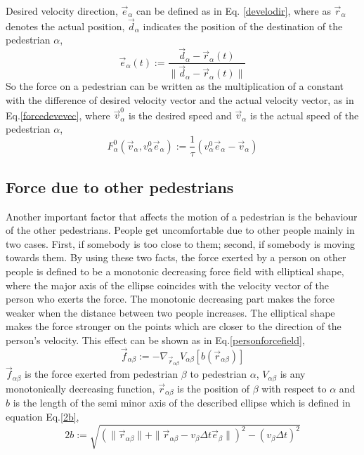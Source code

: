 \documentclass[11pt]{article}
\begin{document}
Desired velocity direction, $\vec{e}_\alpha$ can be defined as in Eq. \ref{develodir}, where as $\vec{r}_\alpha$ denotes the actual position,  $\vec{d}_\alpha$ indicates the position of the destination of the pedestrian $\alpha$,
\begin{equation}
    \vec{e}_\alpha(t):=\frac{\vec{d}_\alpha-\vec{r}_\alpha(t)}{\| \vec{d}_\alpha-\vec{r}_\alpha(t) \|}
\label{develodir}
\end{equation}
So the force on a pedestrian can be written as the multiplication of a constant with the difference of desired velocity vector and the actual velocity vector, as in Eq.\ref{forcedevevec}, where $\vec{v}_\alpha^0$ is the desired speed and $\vec{v}_\alpha$ is the actual speed of the pedestrian $\alpha$,
\begin{equation}
    F_\alpha^0(\vec{v}_\alpha,v_\alpha^0\vec{e}_\alpha) := \frac{1}{\tau}(v_\alpha^0\vec{e}_\alpha-\vec{v}_\alpha)
\label{forcedevevec}
\end{equation}

\subsection{Force due to other pedestrians}
Another important factor that affects the motion of a pedestrian is the behaviour of the other pedestrians. People get uncomfortable due to other people mainly in two cases. First, if somebody is too close to them; second, if somebody is moving towards them.
By using these two facts, the force exerted by a person on other people is defined to be a monotonic decreasing force field with elliptical shape, where the major axis of the ellipse coincides with the velocity vector of the person who exerts the force. The monotonic decreasing part makes the force weaker when the distance between two people increases. The elliptical shape makes the force stronger on the points which are closer to the direction of the person's velocity. This effect can be shown as in Eq.\ref{personforcefield},
\begin{equation}
    \vec{f}_{\alpha\beta}:=-\nabla_{\vec{r}_{\alpha\beta}}V_{\alpha\beta}[b(\vec{r}_{\alpha\beta})]
\label{personforcefield}
\end{equation}
$\vec{f}_{\alpha\beta}$ is the force exerted from pedestrian $\beta$ to pedestrian $\alpha$, $V_{\alpha\beta}$ is any monotonically decreasing function, $\vec{r}_{\alpha\beta}$ is the position of $\beta$ with respect to $\alpha$ and $b$ is the length of the semi minor axis of the described ellipse which is defined in equation Eq.\ref{2b},
\begin{equation}
    2b:=\sqrt{(\|\vec{r}_{\alpha\beta}\|+\|\vec{r}_{\alpha\beta}-v_\beta\Delta t\vec{e}_{\beta}\|)^2-(v_\beta\Delta t)^2}
    \label{2b}
\end{equation}
\end{document}
